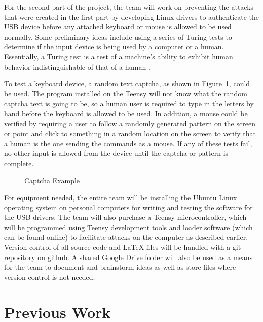 \documentclass[pagenumbers]{ieee}
\begin{document}
For the second part of the project, the team will work on preventing the attacks that were created in the first part by developing Linux drivers to authenticate the USB device before any attached keyboard or mouse is allowed to be used normally. Some preliminary ideas include using a series of Turing tests to determine if the input device is being used by a computer or a human. Essentially, a Turing test is a test of a machine's ability to exhibit human behavior indistinguishable of that of a human \cite{wiki}.

To test a keyboard device, a random text captcha, as shown in  Figure~\ref{fig:Captcha}, could be used. The program installed on the Teensy will not know what the random captcha text is going to be, so a human user is required to type in the letters by hand before the keyboard is allowed to be used. In addition, a mouse could be verified by requiring a user to follow a randomly generated pattern on the screen or point and click to something in a random location on the screen to verify that a human is the one sending the commands as a mouse. If any of these tests fail, no other input is allowed from the device until the captcha or pattern is complete.

\begin{figure}[H]
   \caption{Captcha Example}
   \label{fig:Captcha}
\end{figure}

For equipment needed, the entire team will be installing the Ubuntu Linux operating system on personal computers for writing and testing the software for the USB drivers. The team will also purchase a Teensy microcontroller, which will be programmed using Teensy development tools and loader software (which can be found online) to facilitate attacks on the computer as described earlier. Version control of all source code and LaTeX files will be handled with a git repository on github. A shared Google Drive folder will also be used as a means for the team to document and brainstorm ideas as well as store files where version control is not needed.

\section{Previous Work}
\end{document}
